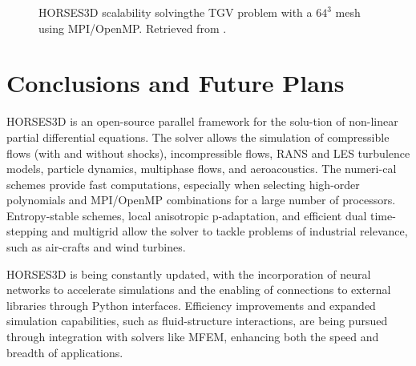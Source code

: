 \documentclass{article}
\begin{document}
\begin{figure}[htbp]
\begin{minipage}{0.45\textwidth}
    \caption{HORSES3D scalability solvingthe TGV problem with a $64^3$ mesh using MPI/OpenMP. Retrieved from \cite{ferrer2023high}.}
    \label{figure3}
  \end{minipage}
\end{figure}
  \section{Conclusions and Future Plans}
  HORSES3D is an open-source parallel framework for the solu-tion of non-linear partial differential equations. The solver allows the simulation of compressible flows (with and without shocks), incompressible flows, RANS and LES turbulence models, particle dynamics, multiphase flows, and aeroacoustics. The numeri-cal schemes provide fast computations, especially when selecting high-order polynomials and MPI/OpenMP combinations for a large number of processors. Entropy-stable schemes, local anisotropic p-adaptation, and efficient dual time-stepping and multigrid allow the solver to tackle problems of industrial relevance, such as air-crafts and wind turbines.
  
  HORSES3D is being constantly updated, with the incorporation of neural networks to accelerate simulations and the enabling of connections to external libraries through Python interfaces. Efficiency improvements and expanded simulation capabilities, such as fluid-structure interactions, are being pursued through integration with solvers like MFEM, enhancing both the speed and breadth of applications.
  


  
\end{document}
